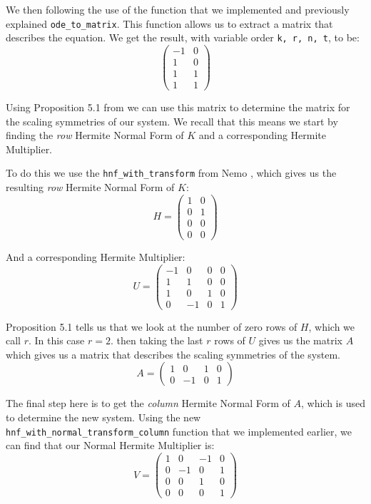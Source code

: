 \documentclass[oneside, a4paper, onecolumn, 11pt]{article}
\begin{document}
We then following the use of the function that we implemented and previously explained \texttt{ode\_to\_matrix}. This function allows us to extract a matrix that describes the equation. We get the result, with variable order \texttt{k, r, n, t}, to be:
\[
    \begin{pmatrix}
        -1 & 0 \\
        1  & 0 \\
        1  & 1 \\
        1  & 1
    \end{pmatrix}
\]

Using Proposition 5.1 from \cite{Hubert2013} we can use this matrix to determine the matrix for the scaling symmetries of our system. We recall that this means we start by finding the \textit{row} Hermite Normal Form of \(K\) and a corresponding Hermite Multiplier.

To do this we use the \texttt{hnf\_with\_transform} from Nemo \cite{nemo}, which gives us the resulting \textit{row} Hermite Normal Form of \(K\):
\[
    H = \begin{pmatrix}
        1 & 0 \\
        0 & 1 \\
        0 & 0 \\
        0 & 0
    \end{pmatrix}
\]

And a corresponding Hermite Multiplier:
\[
    U = \begin{pmatrix}
        -1 & 0  & 0 & 0 \\
        1  & 1  & 0 & 0 \\
        1  & 0  & 1 & 0 \\
        0  & -1 & 0 & 1
    \end{pmatrix}
\]

Proposition 5.1 tells us that we look at the number of zero rows of \(H\), which we call \(r\). In this case \(r = 2\). then taking the last \(r\) rows of \(U\) gives us the matrix \(A\) which gives us a matrix that describes the scaling symmetries of the system.
\[
    A = \begin{pmatrix}
        1 & 0  & 1 & 0 \\
        0 & -1 & 0 & 1
    \end{pmatrix}
\]

The final step here is to get the \textit{column} Hermite Normal Form of \(A\), which is used to determine the new system. Using the new \texttt{hnf\_with\_normal\_transform\_column} function that we implemented earlier, we can find that our Normal Hermite Multiplier is:
\[
    V = \begin{pmatrix}
        1 & 0  & -1 & 0 \\
        0 & -1 & 0  & 1 \\
        0 & 0  & 1  & 0 \\
        0 & 0  & 0  & 1
    \end{pmatrix}
\]
\end{document}
